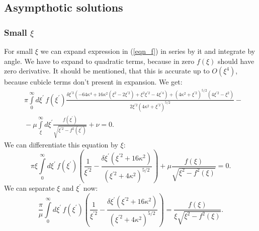 \documentclass[10pt]{article}
\begin{document}


\subsection{Asympthotic solutions}

\subsubsection{Small $\xi$}

For small $\xi$ we can expand expression in (\ref{eqn_f}) in series by it and integrate by angle.
We have to expand to quadratic terms, because in zero $f(\xi)$ should have zero derivative.
It should be mentioned, that this is accurate up to $O(\xi^4)$, because cubicle terms don't present in expansion.
We get:
\begin{equation}
  \begin{aligned}
    &\pi \int\limits_0^\infty d \xi^{\prime} \, f(\xi^{\prime}) \frac{ \delta  \xi^{\prime 3} \left(-64 \kappa ^4+16 \kappa ^2 \left(\xi ^2-2 \xi^{\prime 2} \right)+\xi^2 \xi^{\prime 2}-4 \xi^{\prime 4}\right)+\left(4 \kappa ^2+\xi^{\prime 2} \right)^{5/2} \left(4 \xi^{\prime 2} -\xi ^2\right)}{2 \xi^{\prime 2} \left(4 \kappa ^2+\xi^{\prime 2}\right)^{5/2}} - \\
    &{} - \mu \int\limits_\xi^\infty d \xi^{\prime} \frac{f(\xi^{\prime})}{\sqrt{\xi^{\prime 2} - f^2 (\xi^{\prime})}} + \nu = 0.
  \end{aligned}
\end{equation}
We can differentiate this equation by $\xi$:
\begin{equation}
  \pi \xi \int\limits_0^\infty d \xi^{\prime} \, f(\xi^{\prime}) \left( \frac{1}{\xi^{\prime 2}} - \frac{\delta \xi^{\prime} ( \xi^{\prime 2} + 16 \kappa^2 )}{(\xi^{\prime 2} + 4 \kappa^2)^{5/2}} \right) + \mu \frac{f(\xi)}{\sqrt{\xi^{2} - f^2 (\xi)}} = 0.
\end{equation}
We can separate $\xi$ and $\xi^{\prime}$ now:
\begin{equation}
  \frac{\pi}{\mu} \int\limits_0^\infty d \xi^{\prime} \, f(\xi^{\prime}) \left( \frac{1}{\xi^{\prime 2}} - \frac{\delta \xi^{\prime} ( \xi^{\prime 2} + 16 \kappa^2 )}{(\xi^{\prime 2} + 4 \kappa^2)^{5/2}} \right) =  \frac{f(\xi)}{\xi \sqrt{\xi^{2} - f^2 (\xi)}}.
\end{equation}
\end{document}
